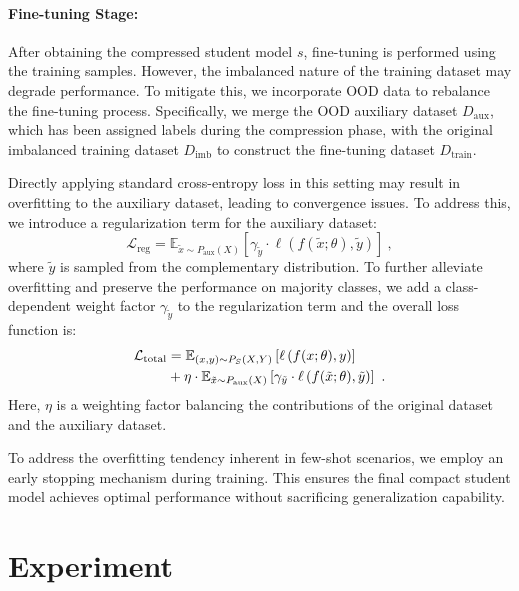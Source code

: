 \documentclass[twoside,11pt]{article}
\begin{document}
\paragraph{Fine-tuning Stage:} After obtaining the compressed student model $ s $, fine-tuning is performed using the training samples. However, the imbalanced nature of the training dataset may degrade performance. To mitigate this, we incorporate OOD data to rebalance the fine-tuning process. Specifically, we merge the OOD auxiliary dataset $ D_{\text{aux}} $, which has been assigned labels during the compression phase, with the original imbalanced training dataset $ D_{\text{imb}} $ to construct the fine-tuning dataset $ D_{\text{train}} $.

Directly applying standard cross-entropy loss in this setting may result in overfitting to the auxiliary dataset, leading to convergence issues. To address this, we introduce a regularization term for the auxiliary dataset:
\begin{equation}
\mathcal{L}_{\text{reg}} = \mathbb{E}_{\tilde{x} \sim P_{\text{aux}}(X)} \left[ \gamma_{\tilde{y}} \cdot \ell \left( f(\tilde{x}; \theta), \tilde{y} \right) \right]\ ,
\end{equation}
where $ \tilde{y} $ is sampled from the complementary distribution. To further alleviate overfitting and preserve the performance on majority classes, we add a class-dependent weight factor $ \gamma_{\tilde{y}} $ to the regularization term and the overall loss function is:
\begin{align}
\label{eq: totalloss}
\mathcal{L}_{\text{total}} &= \mathbb{E}_{(x, y) \sim P_S(X, Y)} \left[ \ell \left( f(x; \theta), y \right) \right] \notag\\
\quad &+ \eta \cdot \mathbb{E}_{\tilde{x} \sim P_{\text{aux}}(X)} \left[ \gamma_{\tilde{y}} \cdot \ell \left( f(\tilde{x}; \theta), \tilde{y} \right) \right]\ . 
\end{align}
Here, $ \eta $ is a weighting factor balancing the contributions of the original dataset and the auxiliary dataset.

To address the overfitting tendency inherent in few-shot scenarios, we employ an early stopping mechanism during training. This ensures the final compact student model achieves optimal performance without sacrificing generalization capability.

\section{Experiment}
\end{document}
